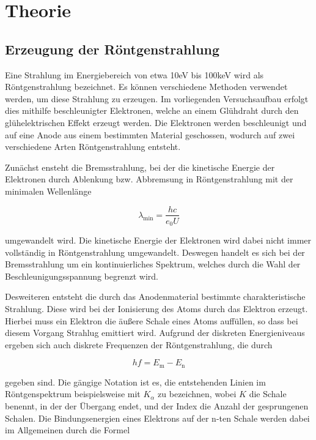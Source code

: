 \section{Theorie}
\label{sec:Theorie}

\subsection{Erzeugung der Röntgenstrahlung}

Eine Strahlung im Energiebereich von etwa 10eV bis 100keV wird als Röntgenstrahlung
bezeichnet. Es können verschiedene Methoden verwendet werden, um diese Strahlung 
zu erzeugen. 
Im vorliegenden Versuchsaufbau erfolgt dies mithilfe beschleunigter
Elektronen, welche an einem Glühdraht durch den glühelektrischen Effekt erzeugt
werden. Die Elektronen werden beschleunigt und auf eine Anode aus einem bestimmten 
Material geschossen, wodurch auf zwei verschiedene Arten Röntgenstrahlung entsteht.

Zunächst ensteht die Bremsstrahlung, bei der die kinetische Energie der Elektronen
durch Ablenkung bzw. Abbremsung in Röntgenstrahlung mit der minimalen Wellenlänge 

\begin{equation}
\lambda_\text{min} = \frac{h c}{e_0 U}
\end{equation}

umgewandelt wird. 
Die kinetische Energie der Elektronen wird dabei nicht immer vollständig in 
Röntgenstrahlung umgewandelt. Deswegen handelt es sich bei der Bremsstrahlung
um ein kontinuierliches Spektrum, welches durch die Wahl der Beschleunigungsspannung
begrenzt wird.

Desweiteren entsteht die durch das Anodenmaterial bestimmte charakteristische 
Strahlung. Diese wird bei der Ionisierung des Atoms durch das Elektron erzeugt. 
Hierbei muss ein Elektron die äußere Schale eines Atoms auffüllen, so dass bei 
diesem Vorgang Strahlug emittiert wird. 
Aufgrund der diskreten Energieniveaus ergeben sich auch diskrete Frequenzen der
Röntgenstrahlung, die durch 

\begin{equation}
h f = E_\text{m} - E_\text{n}
\end{equation}

gegeben sind. 
Die gängige Notation ist es, die entstehenden Linien im Röntgenspektrum 
beispielsweise mit $K_\alpha$ zu bezeichnen, wobei $K$ die Schale benennt,
in der der Übergang endet, und der Index die Anzahl der gesprungenen Schalen. 
Die Bindungsenergien eines Elektrons auf der n-ten Schale werden dabei im 
Allgemeinen durch die Formel 

